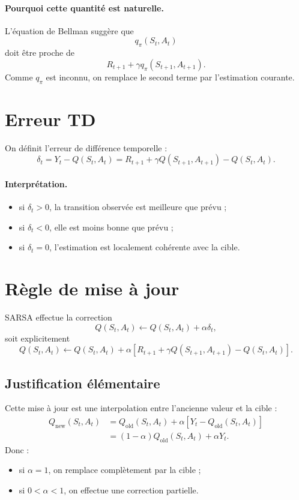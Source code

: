 \documentclass[11pt,a4paper]{article}
\begin{document}
\paragraph{Pourquoi cette quantité est naturelle.}
L'équation de Bellman suggère que
\[
q_{\pi}(S_t,A_t)
\]
doit être proche de
\[
R_{t+1}+\gamma q_{\pi}(S_{t+1},A_{t+1}).
\]
Comme $q_{\pi}$ est inconnu, on remplace le second terme par l'estimation courante.

\section{Erreur TD}

On définit l'erreur de différence temporelle :
\[
\delta_t = Y_t - Q(S_t,A_t)
= R_{t+1}+\gamma Q(S_{t+1},A_{t+1})-Q(S_t,A_t).
\]

\paragraph{Interprétation.}
\begin{itemize}[leftmargin=1.6em]
    \item si $\delta_t>0$, la transition observée est meilleure que prévu ;
    \item si $\delta_t<0$, elle est moins bonne que prévu ;
    \item si $\delta_t=0$, l'estimation est localement cohérente avec la cible.
\end{itemize}

\section{Règle de mise à jour}

SARSA effectue la correction
\[
Q(S_t,A_t)\leftarrow Q(S_t,A_t)+\alpha \delta_t,
\]
soit explicitement
\[
Q(S_t,A_t)\leftarrow Q(S_t,A_t)+\alpha\left[R_{t+1}+\gamma Q(S_{t+1},A_{t+1})-Q(S_t,A_t)\right].
\]

\subsection{Justification élémentaire}

Cette mise à jour est une interpolation entre l'ancienne valeur et la cible :
\begin{align*}
Q_{\text{new}}(S_t,A_t)
&= Q_{\text{old}}(S_t,A_t)+\alpha\left[Y_t-Q_{\text{old}}(S_t,A_t)\right] \\
&= (1-\alpha)Q_{\text{old}}(S_t,A_t)+\alpha Y_t.
\end{align*}
Donc :
\begin{itemize}[leftmargin=1.6em]
    \item si $\alpha=1$, on remplace complètement par la cible ;
    \item si $0<\alpha<1$, on effectue une correction partielle.
\end{itemize}
\end{document}
